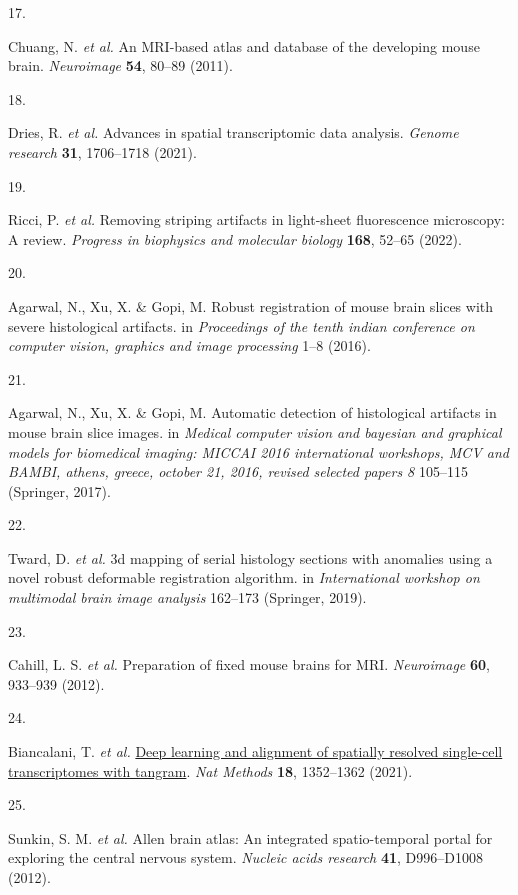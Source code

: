 \documentclass[
  12pt,
]{article}
\newlength{\cslhangindent}
\newlength{\csllabelwidth}
\newenvironment{CSLReferences}[2] %
 {\begin{list}{}{%
  \setlength{\itemindent}{0pt}
  \setlength{\leftmargin}{0pt}
  \setlength{\parsep}{0pt}
  \ifodd #1
   \setlength{\leftmargin}{\cslhangindent}
   \setlength{\itemindent}{-1\cslhangindent}
  \fi
  \setlength{\itemsep}{#2\baselineskip}}}
 {\end{list}}
\newcommand{\CSLLeftMargin}[1]{\parbox[t]{\csllabelwidth}{\strut#1\strut}}
\newcommand{\CSLRightInline}[1]{\parbox[t]{\linewidth - \csllabelwidth}{\strut#1\strut}}
\begin{document}
\begin{CSLReferences}{0}{0}
\CSLLeftMargin{17. }%
\CSLRightInline{Chuang, N. \emph{et al.} An MRI-based atlas and database
of the developing mouse brain. \emph{Neuroimage} \textbf{54}, 80--89
(2011).}

\CSLLeftMargin{18. }%
\CSLRightInline{Dries, R. \emph{et al.} Advances in spatial
transcriptomic data analysis. \emph{Genome research} \textbf{31},
1706--1718 (2021).}

\CSLLeftMargin{19. }%
\CSLRightInline{Ricci, P. \emph{et al.} Removing striping artifacts in
light-sheet fluorescence microscopy: A review. \emph{Progress in
biophysics and molecular biology} \textbf{168}, 52--65 (2022).}

\CSLLeftMargin{20. }%
\CSLRightInline{Agarwal, N., Xu, X. \& Gopi, M. Robust registration of
mouse brain slices with severe histological artifacts. in
\emph{Proceedings of the tenth indian conference on computer vision,
graphics and image processing} 1--8 (2016).}

\CSLLeftMargin{21. }%
\CSLRightInline{Agarwal, N., Xu, X. \& Gopi, M. Automatic detection of
histological artifacts in mouse brain slice images. in \emph{Medical
computer vision and bayesian and graphical models for biomedical
imaging: MICCAI 2016 international workshops, MCV and BAMBI, athens,
greece, october 21, 2016, revised selected papers 8} 105--115 (Springer,
2017).}

\CSLLeftMargin{22. }%
\CSLRightInline{Tward, D. \emph{et al.} 3d mapping of serial histology
sections with anomalies using a novel robust deformable registration
algorithm. in \emph{International workshop on multimodal brain image
analysis} 162--173 (Springer, 2019).}

\CSLLeftMargin{23. }%
\CSLRightInline{Cahill, L. S. \emph{et al.} Preparation of fixed mouse
brains for MRI. \emph{Neuroimage} \textbf{60}, 933--939 (2012).}

\CSLLeftMargin{24. }%
\CSLRightInline{Biancalani, T. \emph{et al.}
\href{https://doi.org/10.1038/s41592-021-01264-7}{Deep learning and
alignment of spatially resolved single-cell transcriptomes with
tangram}. \emph{Nat Methods} \textbf{18}, 1352--1362 (2021).}

\CSLLeftMargin{25. }%
\CSLRightInline{Sunkin, S. M. \emph{et al.} Allen brain atlas: An
integrated spatio-temporal portal for exploring the central nervous
system. \emph{Nucleic acids research} \textbf{41}, D996--D1008 (2012).}


\end{CSLReferences}
\end{document}
